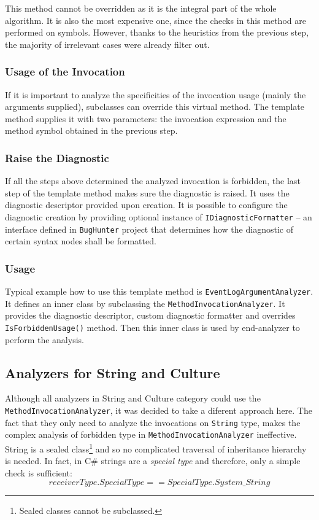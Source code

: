 \documentclass[
  digital, %
  table,   %
  lof,     %
  lot,     %
  oneside,
]{fithesis3}
\begin{document}
This method cannot be overridden as it is the integral part of the whole algorithm. It is also the most expensive one, since the checks in this method are performed on symbols. However, thanks to the heuristics from the previous step, the majority of irrelevant cases were already filter out.

\subsubsection{Usage of the Invocation}
If it is important to analyze the specificities of the invocation usage (mainly the arguments supplied), subclasses can override this virtual method. The template method supplies it with two parameters: the invocation expression and the method symbol obtained in the previous step.

\subsubsection{Raise the Diagnostic}
If all the steps above determined the analyzed invocation is forbidden, the last step of the template method makes sure the diagnostic is raised. It uses the diagnostic descriptor provided upon creation. It is possible to configure the diagnostic creation by providing optional instance of \texttt{IDiagnosticFormatter} -- an interface defined in \texttt{BugHunter} project that determines how the diagnostic of certain syntax nodes shall be formatted. 

\subsubsection{Usage}
Typical example how to use this template method is \texttt{EventLogArgumentAnalyzer}. It defines an inner class by subclassing the \texttt{MethodInvocationAnalyzer}. It provides the diagnostic descriptor, custom diagnostic formatter and overrides \texttt{IsForbiddenUsage()} method. Then this inner class is used by end-analyzer to perform the analysis.

\subsection{Analyzers for String and Culture}
Although all analyzers in String and Culture category could use the \texttt{MethodInvocationAnalyzer}, it was decided to take a diferent approach here. The fact that they only need to analyze the invocations on \texttt{String} type, makes the complex analysis of forbidden type in \texttt{MethodInvocationAnalyzer} ineffective. String is a sealed class\footnote{Sealed classes cannot be subclassed.} and so no complicated traversal of inheritance hierarchy is needed. In fact, in C\# strings are a \textit{special type} and therefore, only a simple check is sufficient:
$$
receiverType.SpecialType == SpecialType.System\_String
$$
\end{document}
